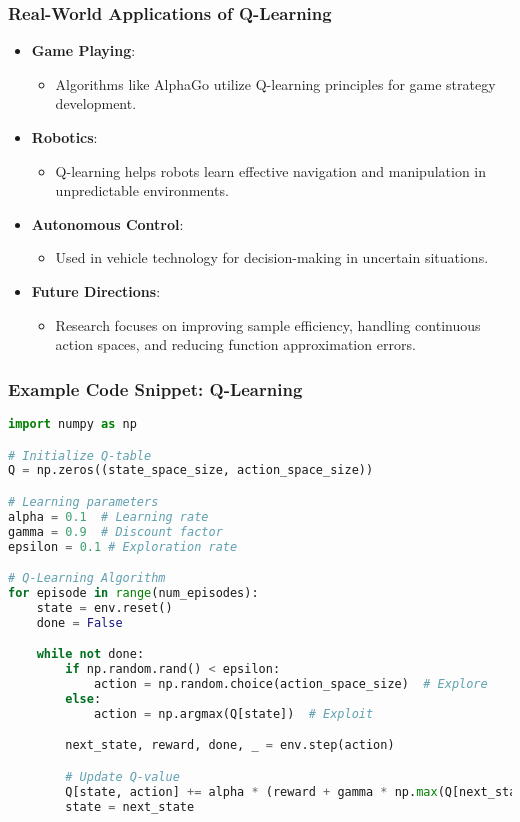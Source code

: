\documentclass[aspectratio=169]{beamer}
\begin{document}
\begin{frame}[fragile]
    \frametitle{Real-World Applications of Q-Learning}
    \begin{itemize}
        \item \textbf{Game Playing}:
        \begin{itemize}
            \item Algorithms like AlphaGo utilize Q-learning principles for game strategy development.
        \end{itemize}
        
        \item \textbf{Robotics}:
        \begin{itemize}
            \item Q-learning helps robots learn effective navigation and manipulation in unpredictable environments.
        \end{itemize}
        
        \item \textbf{Autonomous Control}:
        \begin{itemize}
            \item Used in vehicle technology for decision-making in uncertain situations.
        \end{itemize}
        
        \item \textbf{Future Directions}:
        \begin{itemize}
            \item Research focuses on improving sample efficiency, handling continuous action spaces, and reducing function approximation errors.
        \end{itemize}
    \end{itemize}
\end{frame}

\begin{frame}[fragile]
    \frametitle{Example Code Snippet: Q-Learning}
    \begin{lstlisting}[language=Python]
import numpy as np

# Initialize Q-table
Q = np.zeros((state_space_size, action_space_size))

# Learning parameters
alpha = 0.1  # Learning rate
gamma = 0.9  # Discount factor
epsilon = 0.1 # Exploration rate

# Q-Learning Algorithm
for episode in range(num_episodes):
    state = env.reset()
    done = False

    while not done:
        if np.random.rand() < epsilon:
            action = np.random.choice(action_space_size)  # Explore
        else:
            action = np.argmax(Q[state])  # Exploit

        next_state, reward, done, _ = env.step(action)

        # Update Q-value
        Q[state, action] += alpha * (reward + gamma * np.max(Q[next_state]) - Q[state, action])
        state = next_state
    \end{lstlisting}
\end{frame}
\end{document}
